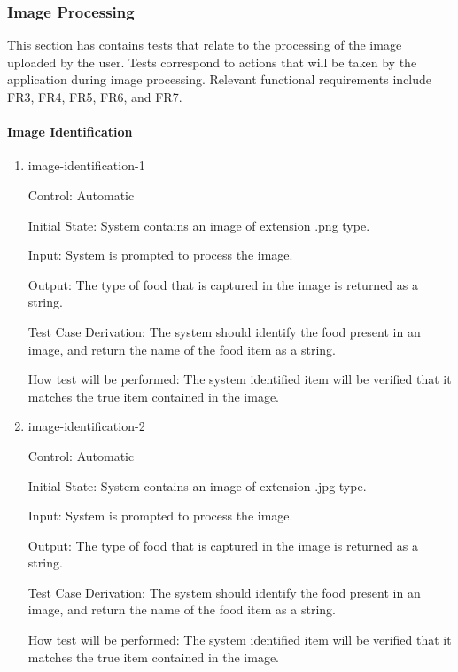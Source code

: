 \documentclass[12pt, titlepage]{article}
\begin{document}
	
	\subsubsection{Image Processing}
	This section has contains tests that relate to the processing of the image 
	uploaded by the user. Tests correspond to actions that will be taken by the 
	application during image processing. Relevant functional requirements 
	include FR3, FR4, FR5, FR6, and FR7.
	
	\paragraph{Image Identification}
	
	\begin{enumerate}
		
		\item{image-identification-1\\}
		
		Control: Automatic
		
		Initial State: System contains an image of extension .png type.
		
		Input: System is prompted to process the image.
		
		Output: The type of food that is captured in the image is returned as a 
		string.
		
		Test Case Derivation: The system should identify the food present in an 
		image, and return the name of the food item as a string.
		
		How test will be performed: The system identified item will be verified 
		that it matches the true item contained in the image.
		
		\item{image-identification-2\\}
		
		Control: Automatic
		
		Initial State: System contains an image of extension .jpg type.
		
		Input: System is prompted to process the image.
		
		Output: The type of food that is captured in the image is returned as a 
		string.
		
		Test Case Derivation: The system should identify the food present in an 
		image, and return the name of the food item as a string.
		
		How test will be performed: The system identified item will be verified 
		that it matches the true item contained in the image.
		

\end{enumerate}
\end{document}
